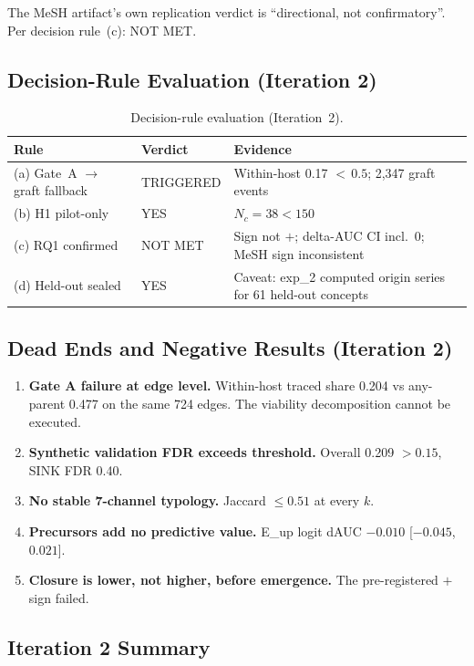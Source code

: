 \documentclass[11pt,letterpaper]{article}
\begin{document}
The MeSH artifact's own replication verdict is ``directional, not confirmatory''. Per decision rule~(c): NOT MET.

\subsection{Decision-Rule Evaluation (Iteration 2)}

\begin{table}[!htbp]
\centering
\caption{Decision-rule evaluation (Iteration~2).}
\label{tab:decisions_iter2}
{\footnotesize\setlength{\tabcolsep}{4pt}
\begin{tabular}{L{2.8cm}L{2cm}L{4.8cm}}
\toprule
Rule & Verdict & Evidence \\
\midrule
(a) Gate~A $\to$ graft fallback & TRIGGERED & Within-host 0.17 ${<}\,0.5$; 2,347 graft events \\
(b) H1 pilot-only & YES & $N_c = 38 < 150$ \\
(c) RQ1 confirmed & NOT MET & Sign not $+$; delta-AUC CI incl.\ 0; MeSH sign inconsistent \\
(d) Held-out sealed & YES & Caveat: exp\_2 computed origin series for 61 held-out concepts \\
\bottomrule
\end{tabular}
}
\end{table}

\subsection{Dead Ends and Negative Results (Iteration 2)}

\begin{enumerate}
\item \textbf{Gate A failure at edge level.} Within-host traced share 0.204 vs any-parent 0.477 on the same 724 edges. The viability decomposition cannot be executed.
\item \textbf{Synthetic validation FDR exceeds threshold.} Overall 0.209 $> 0.15$, SINK FDR 0.40.
\item \textbf{No stable 7-channel typology.} Jaccard $\leq 0.51$ at every $k$.
\item \textbf{Precursors add no predictive value.} E\_up logit dAUC $-0.010$ [$-0.045$, $0.021$].
\item \textbf{Closure is lower, not higher, before emergence.} The pre-registered $+$ sign failed.
\end{enumerate}

\subsection{Iteration 2 Summary}
\end{document}
